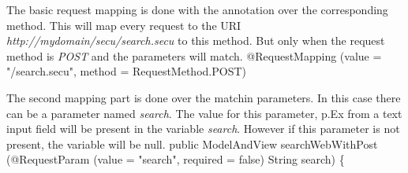 \documentclass{llncs}%
\begin{document}
The basic request mapping is done with the annotation over the corresponding method. This will map every request to the URI {\em http://mydomain/secu/search.secu} to this method. But only when the request method is {\em POST} and the parameters will match.
\nwenddocs{}\endmoddef\nwstartdeflinemarkup{}\nwenddeflinemarkup
@RequestMapping
        (value = "/search.secu", 
        method = RequestMethod.POST)
\nwendcode{}\nwdocspar

The second mapping part is done over the matchin parameters. In this case there can be a parameter named {\em search}. The value for this parameter, p.Ex from a text input field will be present in the variable {\em search}. However if this parameter is not present, the variable will be null.
\nwenddocs{}\endmoddef\nwstartdeflinemarkup{}\nwenddeflinemarkup
public ModelAndView searchWebWithPost
        (@RequestParam
                (value = "search", 
                required = false) 
                String search) \{
\nwendcode{}\nwdocspar
\end{document}
